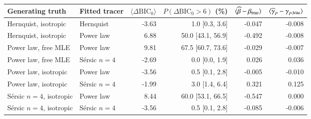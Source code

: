 \begin{tabular}{llrrrr}
\toprule
Generating truth & Fitted tracer & $\langle\Delta\mathrm{BIC}_0\rangle$ & $P(\Delta\mathrm{BIC}_0>6)$ (\%) & $\langle\widehat\beta-\beta_{\rm true}\rangle$ & $\langle\widehat\gamma_p-\gamma_{p,{\rm true}}\rangle$ \\
\midrule
Hernquist, isotropic & Hernquist & -3.63 & 1.0 [0.3, 3.6] & -0.047 & -0.008 \\
Hernquist, isotropic & Power law & 6.88 & 50.0 [43.1, 56.9] & -0.492 & -0.008 \\
Power law, free MLE & Power law & 9.81 & 67.5 [60.7, 73.6] & -0.029 & -0.007 \\
Power law, free MLE & S\'ersic $n=4$ & -2.69 & 0.0 [0.0, 1.9] & 0.026 & 0.036 \\
Power law, isotropic & Power law & -3.56 & 0.5 [0.1, 2.8] & -0.005 & -0.010 \\
Power law, isotropic & S\'ersic $n=4$ & -1.99 & 3.0 [1.4, 6.4] & 0.321 & 0.125 \\
S\'ersic $n=4$, isotropic & Power law & 8.44 & 60.0 [53.1, 66.5] & -0.547 & 0.000 \\
S\'ersic $n=4$, isotropic & S\'ersic $n=4$ & -3.56 & 0.5 [0.1, 2.8] & -0.085 & -0.006 \\
\bottomrule
\end{tabular}
